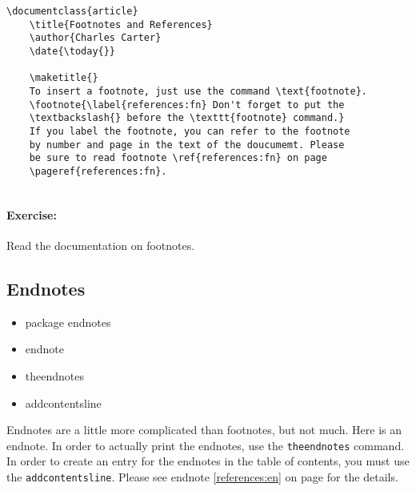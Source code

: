         \begin{verbatim}
\documentclass{article}
    \title{Footnotes and References}
    \author{Charles Carter}
    \date{\today{}}
 
    \maketitle{}
    To insert a footnote, just use the command \text{footnote}.
    \footnote{\label{references:fn} Don't forget to put the 
    \textbackslash{} before the \texttt{footnote} command.} 
    If you label the footnote, you can refer to the footnote 
    by number and page in the text of the doucumemt. Please 
    be sure to read footnote \ref{references:fn} on page 
    \pageref{references:fn}.
    
        \end{verbatim}

        \paragraph{Exercise:} Read the \Lx{} documentation on footnotes.

    \subsection{Endnotes}
    \label{Endnotes}
        
        \begin{cmd}
            \begin{itemize}
                \item{package endnotes}
                \item{endnote}
                \item{theendnotes}
                \item{addcontentsline}
            \end{itemize}
        \end{cmd}

    Endnotes are a little more complicated than footnotes, but not much. Here is an endnote. In order to actually print the endnotes, use the \texttt{theendnotes} command. In order to create an entry for the endnotes in the table of contents, you must use the \texttt{addcontentsline}. Please see endnote \ref{references:en} on page \pageref{references:en} for the details.

